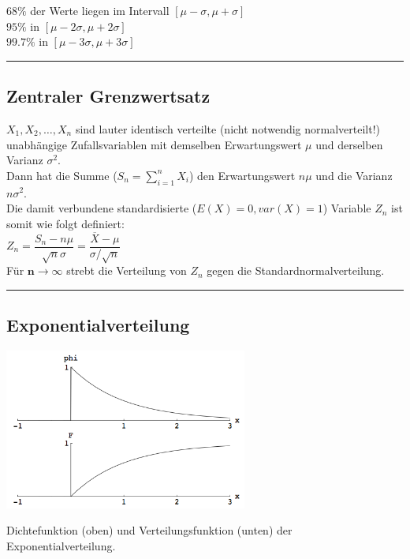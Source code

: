 	$ 68\% $ der Werte liegen im Intervall $[ \mu - \sigma, \mu + \sigma]$ \\ 
	$95\% $ in $[ \mu - 2\sigma, \mu + 2\sigma]$ \\
	$99.7\% $ in $[ \mu - 3\sigma, \mu + 3\sigma]$ \\
	
\hrule \hspace{3mm}
	
	\subsection{Zentraler Grenzwertsatz }
      	$X_1, X_2, \ldots , X_n$ sind lauter identisch verteilte (nicht notwendig normalverteilt!)
      	unabhängige Zufallsvariablen mit demselben Erwartungswert $\mu$ und derselben Varianz $\sigma^2$.
      	\\ 
      	Dann hat die Summe ($S_n = \sum_{i=1}^n X_i$) den Erwartungswert $n \mu$ und die Varianz
      	$n \sigma^2$. \\
      	Die damit verbundene standardisierte ($E(X) = 0, var(X) = 1$) Variable $Z_n$ ist somit wie
      	folgt definiert: \\ $ Z_n = \dfrac{S_n - n \mu}{\sqrt{n} \sigma} = \dfrac{\overline{X} - \mu}{\sigma
      	/ \sqrt{n}}$
      	\\
      	Für $\boldsymbol{n \to \infty}$ strebt die Verteilung von $Z_n$ gegen die
      	Standardnormalverteilung. \\
        
\hrule

	\subsection{Exponentialverteilung }
		\begin{floatingfigure}[r]{8cm}
        \includegraphics[width=8cm]{./bilder/exponentialverteilung.png}
        \caption{Dichtefunktion (oben) und Verteilungsfunktion (unten) der
        Exponentialverteilung.} 		
		\end{floatingfigure}

